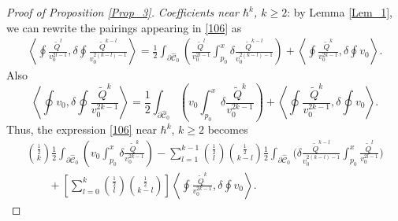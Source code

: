 \documentclass[pdftex]{sigma}
\numberwithin{equation}{section}
\theoremstyle{definition}
\begin{document}
\begin{proof}[Proof of Proposition \ref{Prop_3}]
\textit{Coefficients near $\hbar^k$, $k \geq 2$}: by Lemma \ref{Lem_1}, we can rewrite the pairings appearing in \eqref{106} as
\begin{gather*}%
\left\langle \oint \frac{\tilde{Q}^l}{v_0^{2l-1}}, \delta \oint \frac{\tilde{Q}^{k-l}}{v_0^{2(k-l)-1}}\right\rangle =\frac{1}{2}\int_{\partial \hat{\mathcal{C}}_0}\left( \frac{\tilde{Q}^l}{v_0^{2l-1}}
\int^x_{p_0}\delta \frac{\tilde{Q}^{k-l}}{v_0^{2(k-l)-1}}\right)+\left\langle \oint\frac{\tilde{Q}^k}{v_0^{2k-1}},\delta \oint v_0\right\rangle. \end{gather*}
Also
\begin{equation*}%
\left\langle \oint v_0, \delta \oint \frac{\tilde{Q}^k}{v_0^{2k-1}}\right\rangle =\frac{1}{2}\int_{\partial \hat{\mathcal{C}}_0}\left(v_0
\int^x_{p_0}\delta\frac{\tilde{Q}^k}{v_0^{2k-1}}\right)+\left\langle \oint \frac{\tilde{Q}^k}{v_0^{2k-1}},\delta \oint v_0\right\rangle.
\end{equation*}
Thus, the expression \eqref{106} near $\hbar^k$, $k \geq 2$ becomes
\begin{gather}\label{118}
\binom{\frac{1}{2}}{k}\frac{1}{2}\int_{\partial \hat{\mathcal{C}}_0}\left(v_0
\int^x_{p_0}\delta\frac{\tilde{Q}^k}{v_0^{2k-1}}\right)
-\sum^{k-1}_{l=1}\binom{\frac{1}{2}}{l} \binom{\frac{1}{2}}{k-l}\frac{1}{2}\int_{\partial
\hat{\mathcal{C}}_0}\Bigg(\delta \frac{\tilde{Q}^{k-l}}{v_0^{2(k-l)-1}}
\int^x_{p_0}\frac{\tilde{Q}^l}{v_0^{2l-1}}\Bigg)\\
 \label{119}\qquad{} +\left[ \sum^{k}_{l=0}\binom{\frac{1}{2}}{l}\binom{\frac{1}{2}}{k-l}\right]
 \left\langle \oint \frac{\tilde{Q}^k}{v_0^{2k-1}},\delta \oint v_0\right\rangle .
 \end{gather}


\end{proof}
\end{document}
